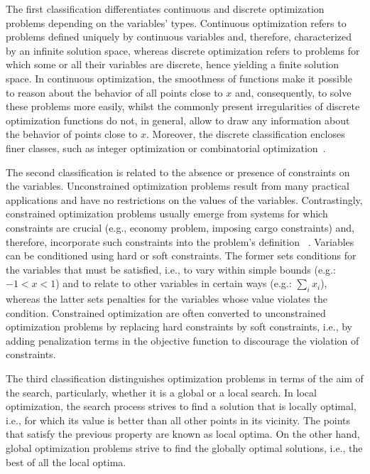 	The first classification differentiates continuous and discrete optimization problems depending on the variables' types. Continuous optimization refers to problems defined uniquely by continuous variables and, therefore, characterized by an infinite solution space, whereas discrete optimization refers to problems for which some or all their variables are discrete, hence yielding a finite solution space. In continuous optimization, the smoothness of functions make it possible to reason about the behavior of all points close to $x$ and, consequently, to solve these problems more easily, whilst the commonly present irregularities of discrete optimization functions do not, in general, allow to draw any information about the behavior of points close to $x$. Moreover, the discrete classification encloses finer classes, such as integer optimization or combinatorial optimization~\cite{Nemhauser1988}. 
	
	The second classification is related to the absence or presence of constraints on the variables. Unconstrained optimization problems result from many practical applications and have no restrictions on the values of the variables. Contrastingly, constrained optimization problems usually emerge from systems for which constraints are crucial (e.g., economy problem, imposing cargo constraints) and, therefore, incorporate such constraints into the problem's definition ~\cite{Nocedal2011NumericalOptimization}. Variables can be conditioned using hard or soft constraints. The former sets conditions for the variables that must be satisfied, i.e., to vary within simple bounds (e.g.: $-1<x<1$) and to relate to other variables in certain ways (e.g.: $\sum_{i} x_i$), whereas the latter sets penalties for the variables whose value violates the condition. Constrained optimization are often converted to unconstrained optimization problems by replacing hard constraints by soft constraints, i.e., by adding penalization terms in the objective function to discourage the violation of constraints. 
	
	The third classification distinguishes optimization problems in terms of the aim of the search, particularly, whether it is a global or a local search. In local optimization, the search process strives to find a solution that is locally optimal, i.e., for which its value is better than all other points in its vicinity. The points that satisfy the previous property are known as local optima. On the other hand, global optimization problems strive to find the globally optimal solutions, i.e., the best of all the local optima.

